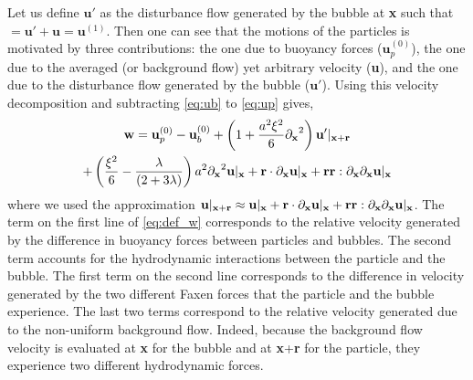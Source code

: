 Let us define $\textbf{u}'$ as the disturbance flow generated by the bubble at \textbf{x} such that $ = \textbf{u}'+\textbf{u} = \textbf{u}^{(1)}$.
Then one can see that the motions of the particles is motivated by three contributions: the one due to buoyancy forces ($\textbf{u}_p^{(0)}$), the one due to the averaged (or background flow) yet arbitrary velocity (\textbf{u}), and the one due to the disturbance flow generated by the bubble ($\textbf{u}'$). 
Using this velocity decomposition and subtracting \eqref{eq:ub} to \eqref{eq:up} gives, 
\begin{multline}
    \textbf{w}
    =
    \textbf{u}_p^{(0)} - \textbf{u}_b^{(0)}
    + \left(1 +\frac{a^2\xi^2}{6} \pddx^2\right) \textbf{u}'|_{\textbf{x}+\textbf{r}}\\
    + \left(\frac{\xi^2}{6} - \frac{\lambda}{(2+3\lambda)}\right) a^2 \pddx^2 \textbf{u}|_{\textbf{x}}
    + \textbf{r} \cdot \pddx \textbf{u}|_{\textbf{x}}+ \textbf{rr}: \pddx\pddx \textbf{u}|_{\textbf{x}}
    \label{eq:def_w}
\end{multline}
where we used the approximation $\textbf{u}|_{\textbf{x}+\textbf{r}} \approx \textbf{u}|_{\textbf{x}} + \textbf{r} \cdot {\partial_\textbf{x}} \textbf{u}|_{\textbf{x}}+ \textbf{rr}: {\partial_\textbf{x}}{\partial_\textbf{x}} \textbf{u}|_{\textbf{x}}$.
The term on the first line of \eqref{eq:def_w} corresponds to the relative velocity generated by the difference in buoyancy forces between particles and bubbles.
The second term accounts for the hydrodynamic interactions between the particle and the bubble. 
The first term on the second line corresponds to the difference in velocity generated by the two different Faxen forces that the particle and the bubble experience. 
The last two terms correspond to the relative velocity generated due to the non-uniform background flow. 
Indeed, because the background flow velocity is evaluated at \textbf{x} for the bubble and at \textbf{x}+\textbf{r} for the particle, they experience two different hydrodynamic forces.
 
